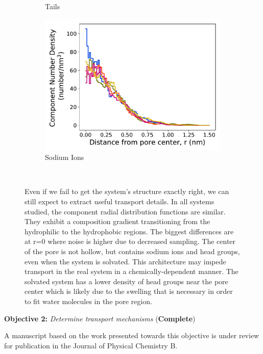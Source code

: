 \documentclass{article}
\begin{document}
\begin{figure}[!htb]
\begin{subfigure}{0.32\textwidth}
        \caption{Tails}
        \label{fig:tails_regional_density}
  \end{subfigure}
  \begin{subfigure}{0.32\textwidth}
        \includegraphics[width=1\linewidth]{sodium_density.pdf}
        \caption{Sodium Ions}
        \label{fig:sodium_regional_density}
  \end{subfigure}
  \caption{Even if we fail to get the system's structure exactly right, we can
	  still expect to extract useful transport details. In all systems studied, the
	  component radial distribution functions are similar. They exhibit a composition
	  gradient transitioning from the hydrophilic to the hydrophobic regions. The
	  biggest differences are at r=0 where noise is higher due to decreased sampling.
	  The center of the pore is not hollow, but contains sodium ions and head groups,
	  even when the system is solvated. This architecture may impede transport in the
	  real system in a chemically-dependent manner. The solvated system has a lower
	  density of head groups near the pore center which is likely due to the swelling
	  that is necessary in order to fit water molecules in the pore
	  region.}~\label{fig:overlaid_densities}
  \vspace{-0.5cm}
  \end{figure}
  
  \noindent \textbf{\large Objective 2:} \textit{\large Determine transport mechanisms} (\textcolor{green!40!olive}{\textbf{Complete}})
  
  \noindent A manuscript based on the work presented towards this objective is under 
  review for publication in the Journal of Physical Chemistry B.
\end{document}
